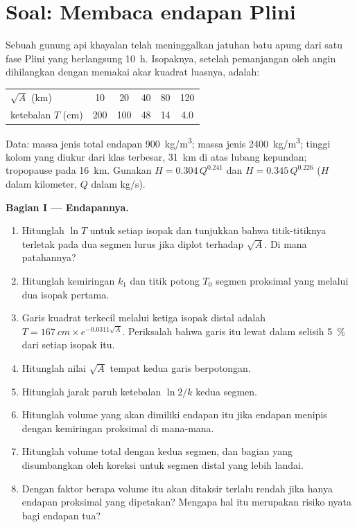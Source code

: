 \section{Soal: Membaca endapan Plini}

\begin{problem}
\label{pb:b2:eruptive-styles:1}
Sebuah gunung api khayalan telah meninggalkan jatuhan batu apung dari satu fase Plini yang
berlangsung \qty{10}{\hour}. Isopaknya, setelah pemanjangan oleh angin dihilangkan dengan
memakai akar kuadrat luasnya, adalah:
\begin{center}
\small
\begin{tabular}{lccccc}
\hline
$\sqrt A$ (\unit{km}) & 10 & 20 & 40 & 80 & 120 \\
ketebalan $T$ (\unit{cm}) & 200 & 100 & 48 & 14 & 4.0 \\
\hline
\end{tabular}
\end{center}
Data: massa jenis total endapan \qty{900}{kg/m^3}; massa jenis 
\qty{2400}{kg/m^3}; tinggi kolom yang diukur dari klas terbesar,
\qty{31}{km} di atas lubang kepundan; tropopause pada \qty{16}{km}. Gunakan $H =
0.304\,Q^{0.241}$ dan $H = 0.345\,Q^{0.226}$ ($H$ dalam kilometer, $Q$ dalam
\unit{kg/s}).

\medskip\noindent\textbf{Bagian I --- Endapannya.}
\begin{enumerate}
\item Hitunglah $\ln T$ untuk setiap isopak dan tunjukkan bahwa titik-titiknya terletak pada dua
segmen lurus jika diplot terhadap $\sqrt A$. Di mana patahannya?
\item Hitunglah kemiringan $k_1$ dan titik potong $T_0$ segmen proksimal
yang melalui dua isopak pertama.
\item Garis kuadrat terkecil melalui ketiga isopak distal adalah $T =
\qty{167}{cm}\times e^{-0.0311\sqrt A}$. Periksalah bahwa garis itu lewat dalam selisih
\qty{5}{\percent} dari setiap isopak itu.
\item Hitunglah nilai $\sqrt A$ tempat kedua garis berpotongan.
\item Hitunglah jarak paruh ketebalan $\ln 2/k$ kedua segmen.
\item Hitunglah volume yang akan dimiliki endapan itu jika endapan menipis dengan kemiringan
proksimal di mana-mana.
\item Hitunglah volume total dengan kedua segmen, dan bagian yang disumbangkan oleh
koreksi untuk segmen distal yang lebih landai.
\item Dengan faktor berapa volume itu akan ditaksir terlalu rendah jika hanya endapan
proksimal yang dipetakan? Mengapa hal itu merupakan risiko nyata bagi endapan tua?
\end{enumerate}


\end{problem}
